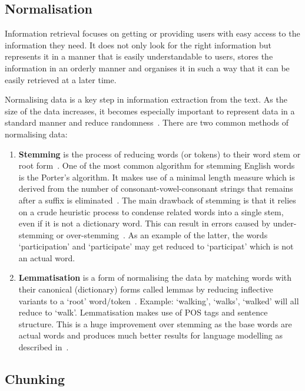\subsection{Normalisation} \label{normalisation}

Information retrieval focuses on getting or providing users with easy access to the information they need. It does not only look for the right information but represents it in a manner that is easily understandable to users, stores the
information in an orderly manner and organises it in such a
way that it can be easily retrieved at a later time.

Normalising data is a key step in information extraction from the text. As the size of the data increases, it becomes especially important to represent data in a standard manner and reduce randomness~\cite{stemming}. There are two common methods of normalising data: 

\begin{enumerate}
    \item \textbf{Stemming} is the process of reducing words (or tokens) to their word stem or root form~\cite{stemming}. One of the most common algorithm for stemming English words is the Porter's algorithm. It makes use of a minimal length measure which is derived from the number of consonant-vowel-consonant strings that remains after a suffix is eliminated~\cite{porter}. The main drawback of stemming is that it relies on a crude heuristic process to condense related words into a single stem, even if it is not a dictionary word. This can result in errors caused by under-stemming or over-stemming~\cite{medium_stemming}. As an example of the latter, the words `participation' and `participate' may get reduced to `participat' which is not an actual word. 
    
    \item \textbf{Lemmatisation} is a form of normalising the data by matching words with their canonical (dictionary) forms called lemmas by reducing inflective variants to a `root' word/token~\cite{stemming}. Example: `walking', `walks', `walked' will all reduce to `walk'. Lemmatisation makes use of POS tags and sentence structure. This is a huge improvement over stemming as the base words are actual words and produces much better results for language modelling as described in~\cite{stemming}. 
    
\end{enumerate}

\subsection{Chunking}

